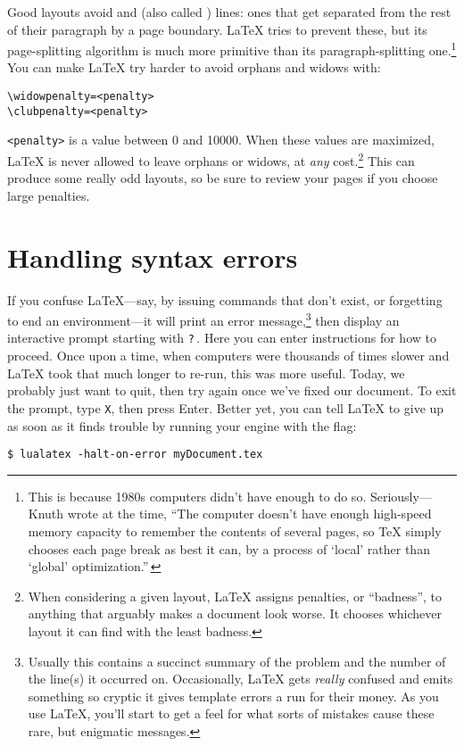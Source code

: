 Good layouts avoid  and 
(also called ) lines:
ones that get separated from the rest of their paragraph by a page boundary.
\LaTeX{} tries to prevent these, but its page-splitting algorithm
is much more primitive than its paragraph-splitting one.\punckern\footnote{%
This is because 1980s computers didn't have enough  to do so.
Seriously---Knuth wrote at the time,
``The computer doesn't have enough high-speed memory capacity to remember the
contents of several pages,
so \TeX{} simply chooses each page break as best it can, by a process of
`local' rather than `global' optimization.\quotekern''\,}
You can make \LaTeX{} try harder to avoid orphans and widows with:
\begin{leftfigure}
\begin{lstlisting}
\widowpenalty=<penalty>
\clubpenalty=<penalty>
\end{lstlisting}
\end{leftfigure}
\verb|<penalty>| is a value between 0 and 10000.
When these values are maximized,
\LaTeX{} is never allowed to leave orphans or widows,
at \emph{any} cost.\punckern\footnote{When considering a given layout,
\LaTeX{} assigns penalties, or ``badness''\quotekern,
to anything that arguably makes a document look worse.
It chooses whichever layout it can find with the least badness.}
This can produce some really odd layouts,
so be sure to review your pages if you choose large penalties.

\section{Handling syntax errors}
If you confuse \LaTeX{}---say, by issuing commands that don't exist,
or forgetting to end an environment---it will print an
error message,\punckern\footnote{Usually this contains a succinct summary of
the problem and the number of the line(s) it occurred on. Occasionally,
\LaTeX{} gets \emph{really} confused and emits something so cryptic it gives
\cpp{} template errors a run for their money.
As you use \LaTeX, you'll start to get a feel for what sorts of
mistakes cause these rare, but enigmatic messages.}
then display an interactive prompt starting with \texttt{?}\,.
Here you can enter instructions for how to proceed.
Once upon a time, when computers were thousands of times slower and
\LaTeX{} took that much longer to re-run, this was more useful.
Today, we probably just want to quit,
then try again once we've fixed our document.
To exit the prompt, type \texttt{X}, then press Enter.
Better yet, you can tell \LaTeX{} to give up as soon as it finds trouble
by running your engine with the  flag:
\begin{leftfigure}
\begin{lstlisting}
$ lualatex -halt-on-error myDocument.tex
\end{lstlisting}
\end{leftfigure}
